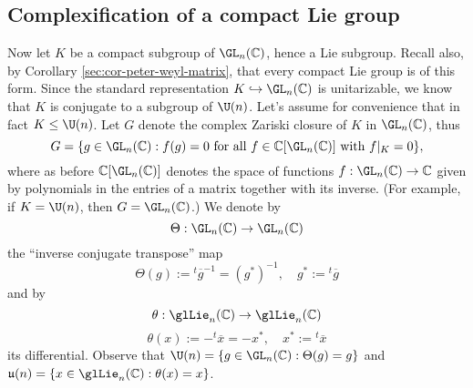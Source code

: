 \documentclass[reqno]{amsart} 
\begin{document}
\subsection{Complexification of a compact Lie group}\label{sec:cnh2voucm5}
Now let $K$ be a compact subgroup of $\GL_n(\mathbb{C})$, hence a Lie subgroup.  Recall also, by Corollary \ref{sec:cor-peter-weyl-matrix}, that every compact Lie group is of this form.  Since the standard representation $K \hookrightarrow \GL_n(\mathbb{C})$ is unitarizable, we know that $K$ is conjugate to a subgroup of $\U(n)$.  Let's assume for convenience that in fact $K \leq \U(n)$.  Let $G$ denote the complex Zariski closure of $K$ in $\GL_n(\mathbb{C})$, thus
\begin{equation*}
  G = \{g \in \GL_n(\mathbb{C}) : f(g) = 0 \text{ for all } f \in \mathbb{C}[\GL_n(\mathbb{C})] \text{ with } f|_K = 0 \},
\end{equation*}
where as before $\mathbb{C}[\GL_n(\mathbb{C})]$ denotes the space of functions $f : \GL_n (\mathbb{C} ) \rightarrow \mathbb{C}$ given by polynomials in the entries of a matrix together with its inverse.  (For example, if $K = \U(n)$, then $G = \GL_n(\mathbb{C})$.)  We denote by
\begin{equation*}
  \Theta : \GL_n(\mathbb{C}) \rightarrow \GL_n(\mathbb{C})
\end{equation*}
the ``inverse conjugate transpose'' map
\begin{equation*}
  \Theta(g) := {}^t \overline{g}^{-1} = (g^*)^{-1}, \quad g^* := {}^t \overline{g}
\end{equation*}
and by
\begin{equation*}
  \theta : \glLie_n(\mathbb{C}) \rightarrow \glLie_n(\mathbb{C})
\end{equation*}
\begin{equation*}
  \theta(x) := - {}^t \overline{x} = - x^*, \quad x^* := {}^t \overline{x}
\end{equation*}
its differential.  Observe that $\U(n) = \{ g \in \GL_n(\mathbb{C}) : \Theta(g) = g\}$ and $\mathfrak{u}(n) = \{ x \in \glLie_n(\mathbb{C}) : \theta(x) = x\}$.
\end{document}

